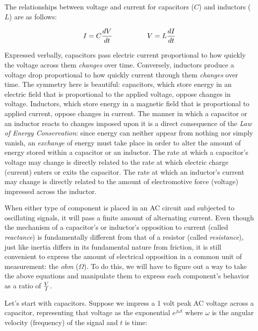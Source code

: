 The relationships between voltage and current for capacitors ($C$) and inductors ($L$) are as follows:

$$I = C {dV \over dt} \hbox{\hskip 50pt} V = L {dI \over dt}$$

Expressed verbally, capacitors pass electric current proportional to how quickly the voltage across them \textit{changes} over time.  Conversely, inductors produce a voltage drop proportional to how quickly current through them \textit{changes} over time.  The symmetry here is beautiful: capacitors, which store energy in an electric field that is proportional to the applied voltage, oppose changes in voltage.  Inductors, which store energy in a magnetic field that is proportional to applied current, oppose changes in current.  The manner in which a capacitor or an inductor reacts to changes imposed upon it is a direct consequence of the \textit{Law of Energy Conservation}: since energy can neither appear from nothing nor simply vanish, an \textit{exchange} of energy must take place in order to alter the amount of energy stored within a capacitor or an inductor.  The rate at which a capacitor's voltage may change is directly related to the rate at which electric charge (current) enters or exits the capacitor.  The rate at which an inductor's current may change is directly related to the amount of electromotive force (voltage) impressed across the inductor.

When either type of component is placed in an AC circuit and subjected to oscillating signals, it will pass a finite amount of alternating current.  Even though the mechanism of a capacitor's or inductor's opposition to current (called \textit{reactance}) is fundamentally different from that of a resistor (called \textit{resistance}), just like inertia differs in its fundamental nature from friction, it is still convenient to express the amount of electrical opposition in a common unit of measurement: the \textit{ohm} ($\Omega$).  To do this, we will have to figure out a way to take the above equations and manipulate them to express each component's behavior as a ratio of $V \over I$.    

\filbreak

Let's start with capacitors.  Suppose we impress a 1 volt peak AC voltage across a capacitor, representing that voltage as the exponential $e^{j \omega t}$ where $\omega$ is the angular velocity (frequency) of the signal and $t$ is time:

